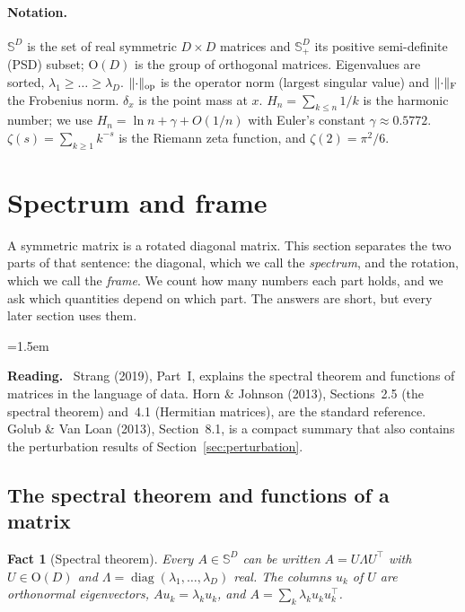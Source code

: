 \documentclass[11pt,a4paper]{article}
\newcommand{\Orth}{\mathrm{O}}
\newcommand{\Sym}{\mathbb{S}}
\DeclareMathOperator{\diag}{diag}
\DeclarePairedDelimiter{\norm}{\lVert}{\rVert}
\newcommand{\op}{\mathrm{op}}
\newcommand{\F}{\mathrm{F}}
\theoremstyle{plain}
\newtheorem{fact}[proposition]{Fact}
\theoremstyle{definition}
\theoremstyle{remark}
\newenvironment{reading}{\begin{list}{}{\leftmargin=1.5em\rightmargin=0pt\topsep=6pt}\small\item[]%
  \textcolor{blue!50!black}{\textbf{Reading.}}\ }{\end{list}}
\begin{document}
\paragraph{Notation.}
$\Sym^D$ is the set of real symmetric $D\times D$ matrices and $\Sym^D_+$ its positive semi-definite (PSD) subset;
$\Orth(D)$ is the group of orthogonal matrices. Eigenvalues are sorted, $\lambda_1\ge\dots\ge\lambda_D$.
$\norm{\cdot}_\op$ is the operator norm (largest singular value) and $\norm{\cdot}_\F$ the Frobenius norm. $\delta_x$
is the point mass at $x$. $H_n=\sum_{k\le n}1/k$ is the harmonic number; we use $H_n=\ln n+\gamma+O(1/n)$ with
Euler's constant $\gamma\approx0.5772$. $\zeta(s)=\sum_{k\ge1}k^{-s}$ is the Riemann zeta function, and
$\zeta(2)=\pi^2/6$.

\section{Spectrum and frame}\label{sec:frame}

A symmetric matrix is a rotated diagonal matrix. This section separates the two parts of that sentence: the
diagonal, which we call the \emph{spectrum}, and the rotation, which we call the \emph{frame}. We count how many
numbers each part holds, and we ask which quantities depend on which part. The answers are short, but every later
section uses them.

\begin{reading}
Strang (2019), Part~I, explains the spectral theorem and functions of matrices in the language of data. Horn \&
Johnson (2013), Sections~2.5 (the spectral theorem) and~4.1 (Hermitian matrices), are the standard reference. Golub
\& Van Loan (2013), Section~8.1, is a compact summary that also contains the perturbation results of
Section~\ref{sec:perturbation}.
\end{reading}

\subsection{The spectral theorem and functions of a matrix}

\begin{fact}[Spectral theorem]\label{fact:spectral}
Every $A\in\Sym^D$ can be written $A=U\Lambda U^\top$ with $U\in\Orth(D)$ and $\Lambda=\diag(\lambda_1,\dots,\lambda_D)$
real. The columns $u_k$ of $U$ are orthonormal eigenvectors, $Au_k=\lambda_ku_k$, and $A=\sum_k\lambda_ku_ku_k^\top$.
\end{fact}
\end{document}
